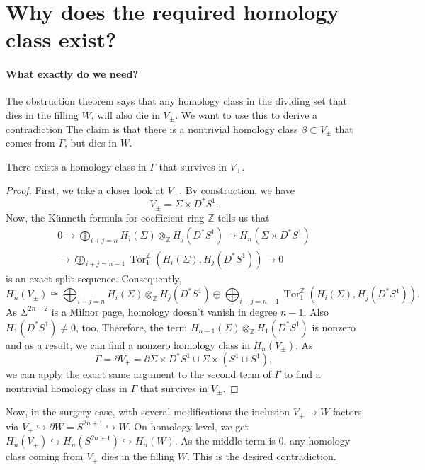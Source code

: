 \section*{Why does the required homology class exist?}

\paragraph*{What exactly do we need?} The obstruction theorem says that
any homology class in the dividing set that dies in the filling $W$, will also
die in $V_{\pm}$. We want to use this to derive a contradiction
The claim is that there is a nontrivial homology class $\beta \subset V_\pm$ that
comes from $\Gamma$, but dies in $W$.

\begin{lemma}
    There exists a homology class in $\Gamma$ that survives in $V_\pm$.
\end{lemma}
\begin{proof}
    First, we take a closer look at $V_\pm$. By construction, we have
    \[
        V_\pm = \Sigma \times D^*S^1.
    \]
    Now, the Künneth-formula for coefficient ring $\mathbb Z$ tells us that
    \begin{multline}
        0 \to \bigoplus_{i+j = n} H_i(\Sigma) \otimes_{\mathbb Z} H_j(D^* S^1) \to  H_n(\Sigma \times D^*S^1)\\
        \to \bigoplus_{i+j = n-1} \operatorname{Tor}^\mathbb{Z}_1\left(H_i(\Sigma), H_j(D^* S^1)\right) \to 0
    \end{multline}
    is an exact split sequence.
    Consequently,
    \[
        H_n(V_\pm) \cong \bigoplus_{i+j = n} H_i(\Sigma) \otimes_{\mathbb Z} H_j(D^* S^1) \oplus \bigoplus_{i+j = n-1} \operatorname{Tor}^\mathbb{Z}_1\left(H_i(\Sigma), H_j(D^* S^1)\right).
    \]
    As $\Sigma^{2n-2}$ is a Milnor page, homology doesn't vanish in degree $n-1$.
    Also $H_1(D^*S^1) \neq 0$, too. Therefore, the term $H_{n-1}(\Sigma) \otimes_{\mathbb Z} H_1(D^*S^1)$ is nonzero and as a result, we can find a nonzero homology class in $H_n(V_\pm)$.
    As 
    \[
        \Gamma = \partial V_\pm = \partial \Sigma \times D^*S^1 \cup \Sigma \times \left(S^1 \sqcup S^1\right),
    \]
    we can apply the exact same argument to the second term of $\Gamma$ to find a
    nontrivial homology class in $\Gamma$ that survives in $V_\pm$.
\end{proof}

Now, in the surgery case, with several modifications the inclusion
$V_+ \to W$ factors via $V_+ \hookrightarrow \partial W = S^{2n+1} \hookrightarrow W$.
On homology level, we get
$H_n(V_+) \hookrightarrow H_n(S^{2n+1}) \hookrightarrow H_n(W)$.
As the middle term is $0$, any homology class coming from $V_+$ dies in the filling $W$.
This is the desired contradiction.